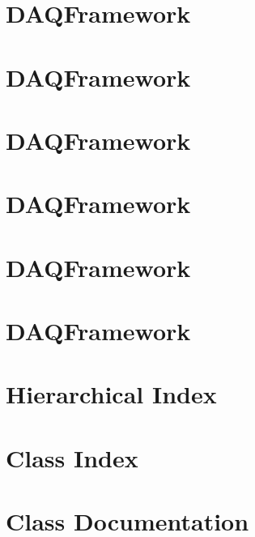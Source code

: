 \let\mypdfximage\pdfximage\def\pdfximage{\immediate\mypdfximage}\documentclass[twoside]{book}
\newcommand{\+}{\discretionary{\mbox{\scriptsize$\hookleftarrow$}}{}{}}
\newcommand{\clearemptydoublepage}{%
  \newpage{\pagestyle{empty}\cleardoublepage}%
}
\begin{document}
\chapter{DAQFramework}
\label{md_src_Store_README}

\chapter{DAQFramework}
\label{md_src_Tool_README}

\chapter{DAQFramework}
\label{md_src_ToolChain_README}

\chapter{DAQFramework}
\label{md_tempinclude_README}

\chapter{DAQFramework}
\label{md_UserTools_README}

\chapter{DAQFramework}
\label{md_UserTools_template_README}

\chapter{Hierarchical Index}

\chapter{Class Index}

\chapter{Class Documentation}



























\backmatter
\newpage
{}
\clearemptydoublepage
{}
\printindex
\end{document}
